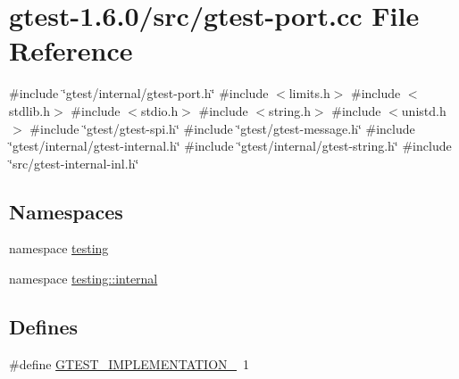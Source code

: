 \hypertarget{gtest-port_8cc}{\section{gtest-\/1.6.0/src/gtest-\/port.cc \-File \-Reference}
\label{df/d09/gtest-port_8cc}
}
{\ttfamily \#include \char`\"{}gtest/internal/gtest-\/port.\-h\char`\"{}}\*
{\ttfamily \#include $<$limits.\-h$>$}\*
{\ttfamily \#include $<$stdlib.\-h$>$}\*
{\ttfamily \#include $<$stdio.\-h$>$}\*
{\ttfamily \#include $<$string.\-h$>$}\*
{\ttfamily \#include $<$unistd.\-h$>$}\*
{\ttfamily \#include \char`\"{}gtest/gtest-\/spi.\-h\char`\"{}}\*
{\ttfamily \#include \char`\"{}gtest/gtest-\/message.\-h\char`\"{}}\*
{\ttfamily \#include \char`\"{}gtest/internal/gtest-\/internal.\-h\char`\"{}}\*
{\ttfamily \#include \char`\"{}gtest/internal/gtest-\/string.\-h\char`\"{}}\*
{\ttfamily \#include \char`\"{}src/gtest-\/internal-\/inl.\-h\char`\"{}}\*
\subsection*{\-Namespaces}
\begin{DoxyCompactItemize}
\item 
namespace \hyperlink{namespacetesting}{testing}
\item 
namespace \hyperlink{namespacetesting_1_1internal}{testing\-::internal}
\end{DoxyCompactItemize}
\subsection*{\-Defines}
\begin{DoxyCompactItemize}
\item 
\#define \hyperlink{gtest-port_8cc_a83bd232fd1077579fada92c31bb7469f}{\-G\-T\-E\-S\-T\-\_\-\-I\-M\-P\-L\-E\-M\-E\-N\-T\-A\-T\-I\-O\-N\-\_\-}~1
\end{DoxyCompactItemize}
